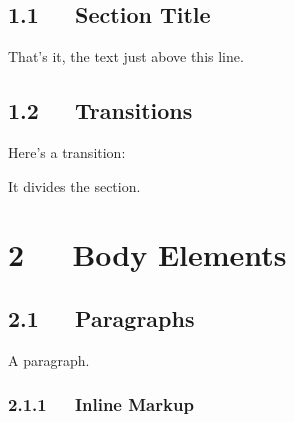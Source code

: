 \documentclass[10pt,english]{article}
\begin{document}

\hypertarget{section-title}{}
\subsection*{1.1~~~Section Title}

That's it, the text just above this line.



\hypertarget{transitions}{}
\subsection*{1.2~~~Transitions}

Here's a transition:


\hspace*{\fill}\hrulefill\hspace*{\fill}


It divides the section.



\hypertarget{body-elements}{}
\section*{2~~~Body Elements}



\hypertarget{paragraphs}{}
\subsection*{2.1~~~Paragraphs}

A paragraph.



\hypertarget{inline-markup}{}
\subsubsection*{2.1.1~~~Inline Markup}
\end{document}
